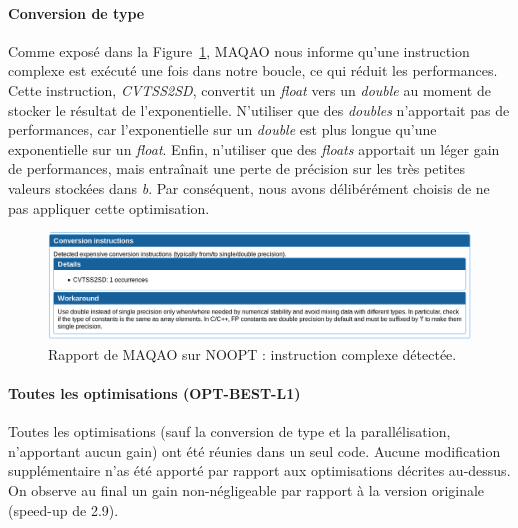 \documentclass[12pt,a4paper]{article}
\begin{document}
\paragraph{Conversion de type} Comme exposé dans la
Figure~\ref{fig.maqao_noopt_complex_instr}, MAQAO nous informe qu'une
instruction complexe est exécuté une fois dans notre boucle, ce qui réduit les
performances. Cette instruction, \textit{CVTSS2SD}, convertit un \textit{float}
vers un \textit{double} au moment de stocker le résultat de l'exponentielle.
N'utiliser que des \textit{doubles} n'apportait pas de performances, car
l'exponentielle sur un \textit{double} est plus longue qu'une exponentielle sur
un \textit{float}. Enfin, n'utiliser que des \textit{floats} apportait un léger
gain de performances, mais entraînait une perte de précision sur les très
petites valeurs stockées dans \textit{b}. Par conséquent, nous avons délibérément
choisis de ne pas appliquer cette optimisation.

\begin{figure}[ht]
    \centering
    \includegraphics[scale=0.4]{./figures/L1/maqao_noopt_complex_instr.png}
    \caption{Rapport de MAQAO sur NOOPT : instruction complexe détectée.}
    \label{fig.maqao_noopt_complex_instr}
\end{figure}

\paragraph{Toutes les optimisations (OPT-BEST-L1)} Toutes les optimisations
(sauf la conversion de type et la parallélisation, n'apportant aucun gain) ont
été réunies dans un seul code. Aucune modification supplémentaire n'as été
apporté par rapport aux optimisations décrites au-dessus. On observe au final
un gain non-négligeable par rapport à la version originale (speed-up de 2.9).
\end{document}

